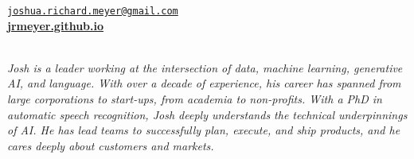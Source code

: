 \documentclass{resume} %
\begin{document}
\vspace{-.25cm}
\begin{center}
\href{mailto:joshua.richard.meyer@gmail.com}{\nolinkurl{joshua.richard.meyer@gmail.com}}\\
\vspace{.15cm}
\href{https://jrmeyer.github.io}{\textbf{jrmeyer.github.io}} \\
\vspace{.15cm}
 \href{https://www.linkedin.com/in/josh-r-meyer/}{\faLinkedin} \hspace{.25cm} \href{https://github.com/JRMeyer}{\faGithub} \hspace{.25cm} \href{https://wa.me/14155899933}{\faWhatsapp} \\

\vspace{.5cm}

\textit{Josh is a leader working at the intersection of data, machine learning, generative AI, and language. With over a decade of experience, his career has spanned from large corporations to start-ups, from academia to non-profits. With a PhD in automatic speech recognition, Josh deeply understands the technical underpinnings of AI. He has lead teams to successfully plan, execute, and ship products, and he cares deeply about customers and markets.}

\vspace{.5cm}

\end{center}


\vspace{.25cm}
\end{document}
